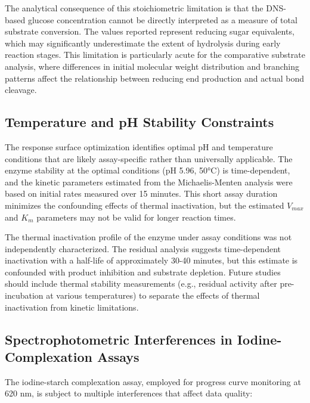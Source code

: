 \documentclass[
  12pt,
]{article}
\begin{document}
The analytical consequence of this stoichiometric limitation is that the
DNS-based glucose concentration cannot be directly interpreted as a
measure of total substrate conversion. The values reported represent
reducing sugar equivalents, which may significantly underestimate the
extent of hydrolysis during early reaction stages. This limitation is
particularly acute for the comparative substrate analysis, where
differences in initial molecular weight distribution and branching
patterns affect the relationship between reducing end production and
actual bond cleavage.

\subsection{Temperature and pH Stability
Constraints}\label{temperature-and-ph-stability-constraints}

The response surface optimization identifies optimal pH and temperature
conditions that are likely assay-specific rather than universally
applicable. The enzyme stability at the optimal conditions (pH 5.96,
50°C) is time-dependent, and the kinetic parameters estimated from the
Michaelis-Menten analysis were based on initial rates measured over 15
minutes. This short assay duration minimizes the confounding effects of
thermal inactivation, but the estimated \(V_{max}\) and \(K_{m}\)
parameters may not be valid for longer reaction times.

The thermal inactivation profile of the enzyme under assay conditions
was not independently characterized. The residual analysis suggests
time-dependent inactivation with a half-life of approximately 30-40
minutes, but this estimate is confounded with product inhibition and
substrate depletion. Future studies should include thermal stability
measurements (e.g., residual activity after pre-incubation at various
temperatures) to separate the effects of thermal inactivation from
kinetic limitations.

\subsection{Spectrophotometric Interferences in Iodine-Complexation
Assays}\label{spectrophotometric-interferences-in-iodine-complexation-assays}

The iodine-starch complexation assay, employed for progress curve
monitoring at 620 nm, is subject to multiple interferences that affect
data quality:
\end{document}
